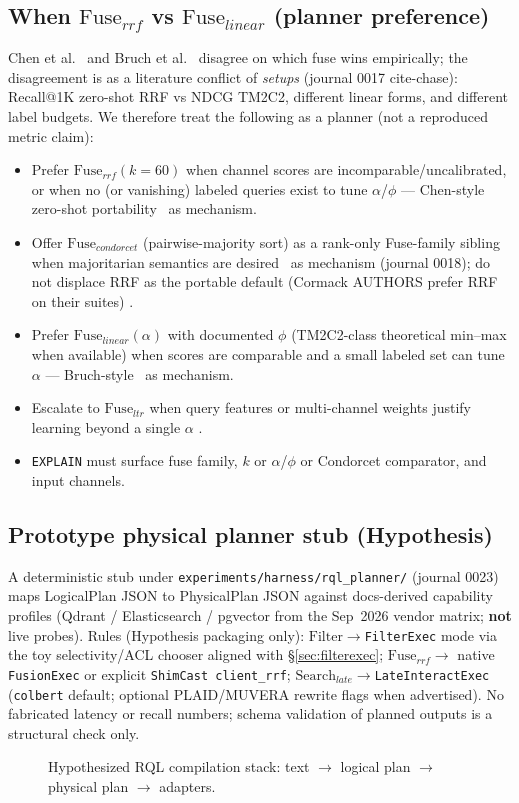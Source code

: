 \subsection{When \(\mathrm{Fuse}_{rrf}\) vs \(\mathrm{Fuse}_{linear}\) (planner preference)}
\label{sec:fuse-preference}
Chen et al.~\citep{chen2022ood} and Bruch et al.~\citep{bruch2023fusion} disagree on which fuse wins empirically; the disagreement is \established{} as a literature conflict of \emph{setups} (journal 0017 cite-chase): Recall@1K zero-shot RRF vs NDCG TM2C2, different linear forms, and different label budgets.
We therefore treat the following as a planner \hypothesis{} (not a reproduced metric claim):
\begin{itemize}
  \item Prefer \(\mathrm{Fuse}_{rrf}(k{=}60)\) when channel scores are incomparable/uncalibrated, or when no (or vanishing) labeled queries exist to tune $\alpha$/$\phi$ --- Chen-style zero-shot portability~\citep{cormack2009rrf,chen2022ood} \established{} as mechanism.
  \item Offer \(\mathrm{Fuse}_{condorcet}\) (pairwise-majority sort) as a rank-only Fuse-family sibling when majoritarian semantics are desired~\citep{montague2002condorcet} \established{} as mechanism (journal 0018); do not displace RRF as the portable default (Cormack AUTHORS prefer RRF on their suites) \hypothesis{}.
  \item Prefer \(\mathrm{Fuse}_{linear}(\alpha)\) with documented $\phi$ (TM2C2-class theoretical min--max when available) when scores are comparable and a small labeled set can tune $\alpha$ --- Bruch-style~\citep{bruch2023fusion} \established{} as mechanism.
  \item Escalate to \(\mathrm{Fuse}_{ltr}\) when query features or multi-channel weights justify learning beyond a single $\alpha$ \hypothesis{}.
  \item \texttt{EXPLAIN} must surface fuse family, $k$ or $\alpha$/$\phi$ or Condorcet comparator, and input channels.
\end{itemize}

\subsection{Prototype physical planner stub (Hypothesis)}
\label{sec:planner-stub}
A deterministic stub under \texttt{experiments/harness/rql\_planner/} (journal 0023) maps LogicalPlan JSON to PhysicalPlan JSON against docs-derived capability profiles (Qdrant / Elasticsearch / pgvector from the Sep~2026 vendor matrix; \textbf{not} live probes).
Rules (Hypothesis packaging only): $\mathrm{Filter}\rightarrow$\texttt{FilterExec} mode via the toy selectivity/ACL chooser aligned with \S\ref{sec:filterexec}; $\mathrm{Fuse}_{rrf}\rightarrow$ native \texttt{FusionExec} or explicit \texttt{ShimCast client\_rrf}; $\mathrm{Search}_{late}\rightarrow$\texttt{LateInteractExec} (\texttt{colbert} default; optional PLAID/MUVERA rewrite flags when advertised).
No fabricated latency or recall numbers; schema validation of planned outputs is a structural check only.

\begin{figure}[t]
\centering

\caption{Hypothesized RQL compilation stack: text $\rightarrow$ logical plan $\rightarrow$ physical plan $\rightarrow$ adapters.}
\label{fig:stack}
\end{figure}
